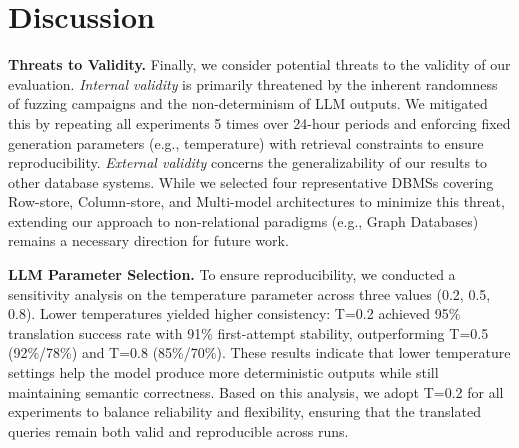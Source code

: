 \documentclass[sigconf,review,anonymous]{acmart}
\begin{document}
\section{Discussion}
\label{sec:discussion}


\textbf{Threats to Validity. }
Finally, we consider potential threats to the validity of our evaluation. \textit{Internal validity} is primarily threatened by the inherent randomness of fuzzing campaigns and the non-determinism of LLM outputs. 
We mitigated this by repeating all experiments 5 times over 24-hour periods and enforcing fixed generation parameters (e.g., temperature) with retrieval constraints to ensure reproducibility. 
\textit{External validity} concerns the generalizability of our results to other database systems. While we selected four representative DBMSs covering Row-store, Column-store, and Multi-model architectures to minimize this threat, extending our approach to non-relational paradigms (e.g., Graph Databases) remains a necessary direction for future work.

\textbf{LLM Parameter Selection. } \label{sec:llm-params}
To ensure reproducibility, we conducted a sensitivity analysis on the temperature parameter across three values (0.2, 0.5, 0.8). Lower temperatures yielded higher consistency: T=0.2 achieved 95\% translation success rate with 91\% first-attempt stability, outperforming T=0.5 (92\%/78\%) and T=0.8 (85\%/70\%). 
These results indicate that lower temperature settings help the model produce more deterministic outputs while still maintaining semantic correctness. 
Based on this analysis, we adopt T=0.2 for all experiments to balance reliability and flexibility, ensuring that the translated queries remain both valid and reproducible across runs.
\end{document}
